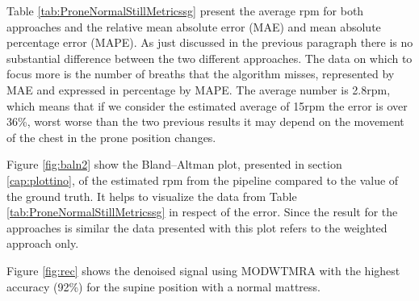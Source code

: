 \vspace{1.3cm}
%


\vspace{0.5cm}

Table \ref{tab:ProneNormalStillMetricssg} present the average rpm for both approaches  
and the relative mean absolute error (MAE) and mean absolute percentage error (MAPE). As just discussed in the previous paragraph there is no substantial difference between the two different approaches. The data on which to focus more is the number of breaths that the algorithm misses, represented by MAE and expressed in percentage by MAPE. The average number is 2.8rpm, which means that if we consider the estimated average of 15rpm the error is over 36\%, worst worse than the two previous results it may depend on the movement of the chest in the prone position changes.


\vspace{1cm}

\vspace{0.5cm}

Figure \ref{fig:baln2} show the Bland–Altman plot, presented in section \ref{cap:plottino}, of the estimated rpm from the pipeline compared to the value of the ground truth. It helps to visualize the data from Table \ref{tab:ProneNormalStillMetricssg} in respect of the error. Since the result for the approaches is similar the data presented with this plot refers to the weighted approach only.

Figure \ref{fig:rec} shows the denoised signal using MODWTMRA with the highest accuracy (92\%) for the supine position with a normal mattress.

